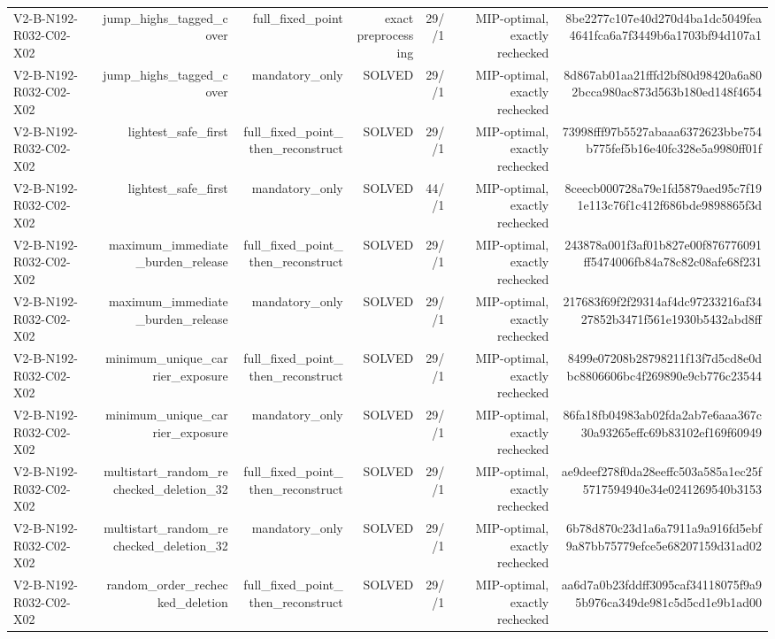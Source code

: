 {\begin{longtable}{lrrrrrr}
V2-B-N192-R032-C02-X02 & jump\_highs\_tagged\_cover & full\_fixed\_point & exact preprocessing & 29//1 & MIP-optimal, exactly rechecked & 8be2277c107e40d270d4ba1dc5049fea4641fca6a7f3449b6a1703bf94d107a1 \\
V2-B-N192-R032-C02-X02 & jump\_highs\_tagged\_cover & mandatory\_only & SOLVED & 29//1 & MIP-optimal, exactly rechecked & 8d867ab01aa21fffd2bf80d98420a6a802bcca980ac873d563b180ed148f4654 \\
V2-B-N192-R032-C02-X02 & lightest\_safe\_first & full\_fixed\_point\_then\_reconstruct & SOLVED & 29//1 & MIP-optimal, exactly rechecked & 73998fff97b5527abaaa6372623bbe754b775fef5b16e40fc328e5a9980ff01f \\
V2-B-N192-R032-C02-X02 & lightest\_safe\_first & mandatory\_only & SOLVED & 44//1 & MIP-optimal, exactly rechecked & 8ceecb000728a79e1fd5879aed95c7f191e113c76f1c412f686bde9898865f3d \\
V2-B-N192-R032-C02-X02 & maximum\_immediate\_burden\_release & full\_fixed\_point\_then\_reconstruct & SOLVED & 29//1 & MIP-optimal, exactly rechecked & 243878a001f3af01b827e00f876776091ff5474006fb84a78c82c08afe68f231 \\
V2-B-N192-R032-C02-X02 & maximum\_immediate\_burden\_release & mandatory\_only & SOLVED & 29//1 & MIP-optimal, exactly rechecked & 217683f69f2f29314af4dc97233216af3427852b3471f561e1930b5432abd8ff \\
V2-B-N192-R032-C02-X02 & minimum\_unique\_carrier\_exposure & full\_fixed\_point\_then\_reconstruct & SOLVED & 29//1 & MIP-optimal, exactly rechecked & 8499e07208b28798211f13f7d5cd8e0dbc8806606bc4f269890e9cb776c23544 \\
V2-B-N192-R032-C02-X02 & minimum\_unique\_carrier\_exposure & mandatory\_only & SOLVED & 29//1 & MIP-optimal, exactly rechecked & 86fa18fb04983ab02fda2ab7e6aaa367c30a93265effc69b83102ef169f60949 \\
V2-B-N192-R032-C02-X02 & multistart\_random\_rechecked\_deletion\_32 & full\_fixed\_point\_then\_reconstruct & SOLVED & 29//1 & MIP-optimal, exactly rechecked & ae9deef278f0da28eeffc503a585a1ec25f5717594940e34e0241269540b3153 \\
V2-B-N192-R032-C02-X02 & multistart\_random\_rechecked\_deletion\_32 & mandatory\_only & SOLVED & 29//1 & MIP-optimal, exactly rechecked & 6b78d870c23d1a6a7911a9a916fd5ebf9a87bb75779efce5e68207159d31ad02 \\
V2-B-N192-R032-C02-X02 & random\_order\_rechecked\_deletion & full\_fixed\_point\_then\_reconstruct & SOLVED & 29//1 & MIP-optimal, exactly rechecked & aa6d7a0b23fddff3095caf34118075f9a95b976ca349de981c5d5cd1e9b1ad00 \\

\end{longtable}}
